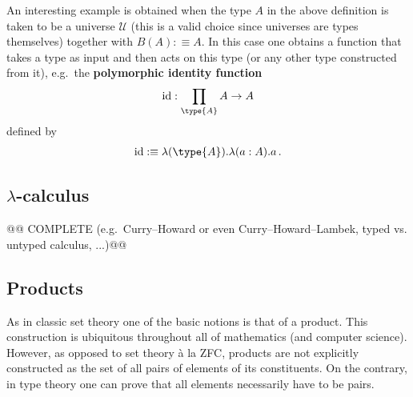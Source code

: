     \begin{example}
        An interesting example is obtained when the type $A$ in the above definition is taken to be a universe $\mathcal{U}$ (this is a valid choice since universes are types themselves) together with $B(A):\equiv A$. In this case one obtains a function that takes a type as input and then acts on this type (or any other type constructed from it), e.g.~the \textbf{polymorphic identity function}
        \begin{gather}
            \mathrm{id}:\prod_{\type{A}}A\rightarrow A
        \end{gather}
        defined by
        \begin{gather}
            \mathrm{id}:\equiv\lambda(\type{A}).\lambda(a:A).a\,.
        \end{gather}
    \end{example}

\subsection{\texorpdfstring{$\lambda$-calculus}{Lambda-calculus}}

    @@ COMPLETE (e.g.~Curry--Howard or even Curry--Howard--Lambek, typed vs. untyped calculus, ...)@@

\subsection{Products}

    As in classic set theory one of the basic notions is that of a product. This construction is ubiquitous throughout all of mathematics (and computer science). However, as opposed to set theory \`a la ZFC, products are not explicitly constructed as the set of all pairs of elements of its constituents. On the contrary, in type theory one can prove that all elements necessarily have to be pairs.

